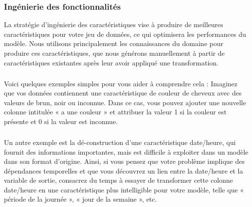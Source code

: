 \documentclass[a4paper, 12pt]{article}
\begin{document}
	\subsubsection{Ingénierie des fonctionnalités}La stratégie d'ingénierie des caractéristiques vise à produire de meilleures caractéristiques pour votre jeu de données, ce qui optimisera les performances du modèle. Nous utilisons principalement les connaissances du domaine pour produire ces caractéristiques, que nous générons manuellement à partir de caractéristiques existantes après leur avoir appliqué une transformation.
	\subparagraph{}Voici quelques exemples simples pour vous aider à comprendre cela :
	Imaginez que vos données contiennent une caractéristique de couleur de cheveux avec des valeurs de brun, noir ou inconnue. Dans ce cas, vous pouvez ajouter une nouvelle colonne intitulée « a une couleur » et attribuer la valeur 1 si la couleur est présente et 0 si la valeur est inconnue.
	\subparagraph{}Un autre exemple est la dé-construction d'une caractéristique date/heure, qui fournit des informations importantes, mais est difficile à exploiter dans un modèle dans son format d'origine. Ainsi, si vous pensez que votre problème implique des dépendances temporelles et que vous découvrez un lien entre la date/heure et la variable de sortie, consacrez du temps à essayer de transformer cette colonne date/heure en une caractéristique plus intelligible pour votre modèle, telle que « période de la journée », « jour de la semaine », etc.
\end{document}
